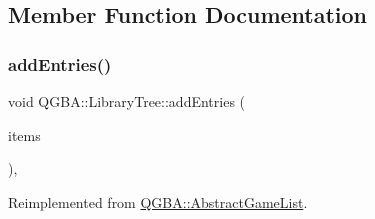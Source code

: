 \subsection{Member Function Documentation}
\mbox{\label{class_q_g_b_a_1_1_library_tree_ad824322266cad285b9195ca1314b67b1}} 
\subsubsection{\texorpdfstring{add\+Entries()}{addEntries()}}
{\footnotesize\ttfamily void Q\+G\+B\+A\+::\+Library\+Tree\+::add\+Entries (\begin{DoxyParamCaption}\item[{Q\+List$<$ \mbox{\hyperlink{namespace_q_g_b_a_a201fa9f2cb8f778666a134ba81909358}{Library\+Entry\+Ref}} $>$}]{items }\end{DoxyParamCaption})\hspace{0.3cm}{\ttfamily [override]}, {\ttfamily [virtual]}}



Reimplemented from \mbox{\hyperlink{class_q_g_b_a_1_1_abstract_game_list_a497a70573ba98309c74526c67d282ec3}{Q\+G\+B\+A\+::\+Abstract\+Game\+List}}.

